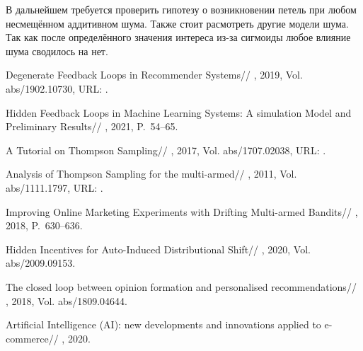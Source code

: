 \documentclass[12pt, twoside]{article}
\begin{document}
В дальнейшем требуется проверить гипотезу о возникновении петель при любом несмещённом аддитивном шума. 
Также стоит расмотреть другие модели шума. 
Так как после определённого значения интереса из-за сигмоиды любое влияние шума сводилось на нет. 
\begin{thebibliography}{99}
    Degenerate Feedback Loops in Recommender Systems//
    , 2019, Vol. abs/1902.10730,
	  URL: .

    Hidden Feedback Loops in Machine Learning Systems: A simulation Model and Preliminary Results//
    , 2021, P.~54--65.

    A Tutorial on Thompson Sampling//
    , 2017, Vol. abs/1707.02038,
	  URL: .

    Analysis of Thompson Sampling for the multi-armed//
    , 2011, Vol. abs/1111.1797,
	  URL: .

    Improving Online Marketing Experiments with Drifting Multi-armed Bandits//
    , 2018, P.~630--636.

    Hidden Incentives for Auto-Induced Distributional Shift//
    , 2020, Vol. abs/2009.09153.

    The closed loop between opinion formation and personalised recommendations//
    , 2018, Vol. abs/1809.04644.

    Artificial Intelligence (AI): new developments and innovations applied to e-commerce//
    , 2020.
\end{thebibliography}

\end{document}
